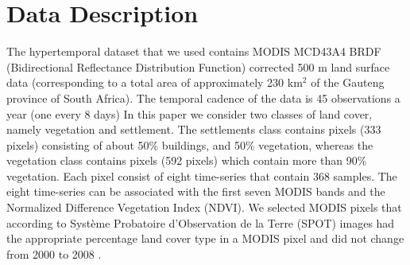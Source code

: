 \documentclass{article}
\begin{document}
\section{Data Description}
\label{sec:data}
The hypertemporal dataset that we used contains MODIS MCD43A4 BRDF (Bidirectional Reflectance Distribution Function) corrected 500 m land surface
data (corresponding to a total area of approximately 230 km$^2$ of the Gauteng province of South Africa). The temporal cadence of the data is 45 observations a year (one every 8 days) In this paper we consider two classes of land cover, namely vegetation and settlement. The settlements class contains pixels (333 pixels) consisting of about
50\% buildings, and 50\% vegetation, whereas the vegetation class contains pixels (592 pixels) which contain more than 90\% vegetation. Each pixel consist of eight time-series that contain 368 samples. The eight time-series can be associated with the first seven MODIS bands and the Normalized Difference Vegetation Index (NDVI).
We selected MODIS pixels that according to Système Probatoire d’Observation de la Terre (SPOT) images had the appropriate percentage land cover type in a MODIS pixel and did not change from 2000 to 2008 \cite{grobler2012}.


% 

\end{document}

